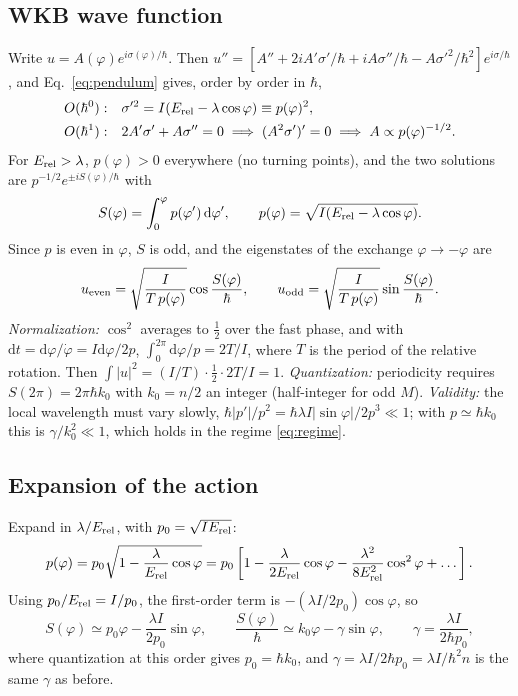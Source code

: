 \documentclass[aps,pra,onecolumn,notitlepage,nofootinbib,11pt]{revtex4-2}
\newcommand{\dd}{\mathrm{d}}
\newcommand{\Erel}{E_{\rm rel}}
\begin{document}
\subsection{WKB wave function}

Write $u=A(\varphi)e^{i\sigma(\varphi)/\hbar}$. Then
$u''=[A''+2iA'\sigma'/\hbar+iA\sigma''/\hbar-A\sigma'^{2}/\hbar^{2}]e^{i\sigma/\hbar}$, and
Eq.~\eqref{eq:pendulum} gives, order by order in $\hbar$,
\begin{align}
O(\hbar^{0}):&\quad\sigma'^{2}=I(\Erel-\lambda\cos\varphi)\equiv p(\varphi)^{2},\\
O(\hbar^{1}):&\quad2A'\sigma'+A\sigma''=0\;\Longrightarrow\;(A^{2}\sigma')'=0
\;\Longrightarrow\;A\propto p(\varphi)^{-1/2}.
\end{align}
For $\Erel>\lambda$, $p(\varphi)>0$ everywhere (no turning points), and the two
solutions are $p^{-1/2}e^{\pm iS(\varphi)/\hbar}$ with
\begin{equation}
S(\varphi)=\int_{0}^{\varphi}p(\varphi')\,\dd\varphi',\qquad
p(\varphi)=\sqrt{I(\Erel-\lambda\cos\varphi)}.
\label{eq:action}
\end{equation}
Since $p$ is even in $\varphi$, $S$ is odd, and the eigenstates of the exchange
$\varphi\to-\varphi$ are
\begin{equation}
u_{\rm even}=\sqrt{\frac{I}{T\,p(\varphi)}}\cos\frac{S(\varphi)}{\hbar},\qquad
u_{\rm odd}=\sqrt{\frac{I}{T\,p(\varphi)}}\sin\frac{S(\varphi)}{\hbar}.
\label{eq:WKB}
\end{equation}
\emph{Normalization:} $\cos^{2}$ averages to $\tfrac12$ over the fast phase, and with
$\dd t=\dd\varphi/\dot\varphi=I\dd\varphi/2p$, $\int_{0}^{2\pi}\dd\varphi/p=2T/I$, where $T$
is the period of the relative rotation. Then
$\int|u|^{2}=(I/T)\cdot\tfrac12\cdot2T/I=1$.
\emph{Quantization:} periodicity requires $S(2\pi)=2\pi\hbar k_{0}$ with $k_{0}=n/2$ an
integer (half-integer for odd $M$). \emph{Validity:} the local wavelength must vary
slowly, $\hbar|p'|/p^{2}=\hbar\lambda I|\sin\varphi|/2p^{3}\ll1$; with $p\simeq\hbar k_{0}$
this is $\gamma/k_{0}^{2}\ll1$, which holds in the regime \eqref{eq:regime}.

\subsection{Expansion of the action}

Expand in $\lambda/\Erel$, with $p_{0}=\sqrt{I\Erel}$:
\begin{equation}
p(\varphi)=p_{0}\sqrt{1-\frac{\lambda}{\Erel}\cos\varphi}
=p_{0}\left[1-\frac{\lambda}{2\Erel}\cos\varphi-\frac{\lambda^{2}}{8\Erel^{2}}\cos^{2}\varphi
+\dots\right].
\end{equation}
Using $p_{0}/\Erel=I/p_{0}$, the first-order term is $-(\lambda I/2p_{0})\cos\varphi$, so
\begin{equation}
S(\varphi)\simeq p_{0}\varphi-\frac{\lambda I}{2p_{0}}\sin\varphi,\qquad
\frac{S(\varphi)}{\hbar}\simeq k_{0}\varphi-\gamma\sin\varphi,\qquad
\gamma=\frac{\lambda I}{2\hbar p_{0}},
\label{eq:Sexp}
\end{equation}
where quantization at this order gives $p_{0}=\hbar k_{0}$, and
$\gamma=\lambda I/2\hbar p_{0}=\lambda I/\hbar^{2}n$ is the same $\gamma$ as before.
\end{document}
